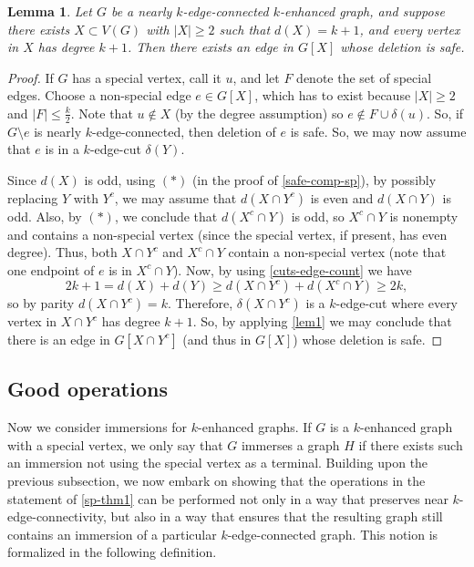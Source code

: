\documentclass[letterpaper,11pt]{article}
\newtheorem{lemma}[theorem]{Lemma}
\theoremstyle{definition}
\begin{document}
	
	
\begin{lemma}
\label{lem13}
Let $G$ be a nearly $k$-edge-connected $k$-enhanced graph, and suppose there exists $X \subset V(G)$ with $|X|\ge 2$ such that $ d(X)=k+1$, and every vertex in $X$ has degree $k+1$.  Then there exists an edge in $G[X]$ whose deletion is safe.
\end{lemma}




\begin{proof}
If $G$ has a special vertex, call it $u$, and let $F$ denote the set of special edges. Choose a non-special edge $e \in G[X]$, which has to exist because $|X|\geq 2$ and $|F| \le \frac{k}{2}$.  Note that $u \not\in  X$  (by the degree assumption) so $e  \not\in F \cup \delta(u)$.  So, if $G\setminus e$ is nearly $k$-edge-connected, then deletion of $e$ is safe. So, we may now assume that $e$ is in a $k$-edge-cut $\delta (Y)$.

Since $d(X)$ is odd, using $(*)$ (in the proof of \cref{safe-comp-sp}), by possibly replacing $Y$ with $Y^c$, we may assume that $d(X \cap Y^c)$ is even and $d(X \cap Y)$ is odd. Also, by $(*)$, we conclude that $d(X^c \cap Y)$ is odd, so $X^c \cap Y$ is nonempty and contains a non-special vertex (since the special vertex, if present, has even degree). Thus, both $X\cap Y^c$ and $X^c \cap Y$ contain a non-special vertex (note that one endpoint of $e$ is in $X^c \cap Y$). Now, by using \cref{cuts-edge-count} we have
$$2k+1=d(X)+d(Y)\geq d(X \cap Y^c) + d(X^c \cap Y) \geq 2k, $$ 
so by parity $d(X\cap Y^c)=k$. Therefore,  $\delta (X \cap Y^c)$ is a $k$-edge-cut where every vertex in $X\cap Y^c$ has degree $k+1$.  So, by applying \cref{lem1} we may conclude that there is an edge  in $G[X \cap Y^c]$ (and thus in $G[X]$) whose deletion is safe.
\end{proof}




\subsection{Good operations}
\label{sub-good}




Now we consider immersions for $k$-enhanced graphs. If $G$ is a $k$-enhanced graph  with a special vertex, we only say that $G$ immerses a graph $H$ if there exists such an immersion not using the special vertex as a terminal.  Building upon the previous subsection, we now embark on showing that the operations in the statement of \cref{sp-thm1} can be performed not only in a way that preserves near $k$-edge-connectivity, but also in a way that ensures that the resulting graph still contains an immersion of a particular $k$-edge-connected graph. This notion is formalized in the following definition.
\end{document}
